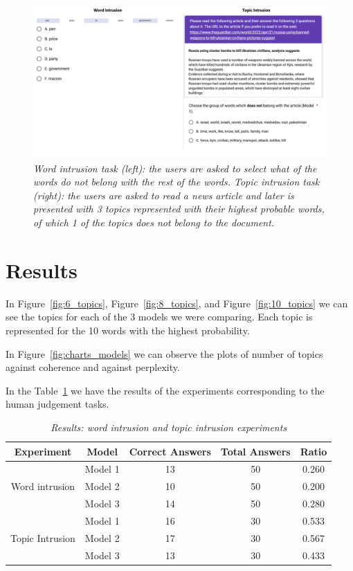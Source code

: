 \documentclass[twoside,12pt,a4paper]{article}
\begin{document}
\begin{figure}[h]
\centering
\includegraphics[scale=0.35]{forms_results.png}
\caption{\textit{Word intrusion task (left): the users are asked to select what of the words do not belong with the rest of the words. Topic intrusion task (right): the users are asked to read a news article and later is presented with 3 topics represented with their highest probable words, of which 1 of the topics does not belong to the document.}}
\label{fig:forms_results}
\end{figure}

\clearpage
\section{Results}
In Figure~\ref{fig:6_topics}, Figure~\ref{fig:8_topics}, and Figure~\ref{fig:10_topics} we can see the topics for each of the 3 models we were comparing. Each topic is represented for the 10 words with the highest probability.

In Figure~\ref{fig:charts_models} we can observe the plots of number of topics against coherence and against perplexity.

In the Table~\ref{table:forms_results} we have the results of the experiments corresponding to the human judgement tasks.\\

\begin{table}[h!]
\centering
\begin{tabular}{c c c c c} 
\hline
Experiment & Model & Correct Answers & Total Answers & Ratio \\ [0.5ex] 
\hline
& Model 1 & 13 & 50 & 0.260\\ 
Word intrusion & Model 2 & 10 & 50 & 0.200 \\
& Model 3 & 14 & 50 & 0.280 \\ [1ex] 
\hline
& Model 1 & 16 & 30 & 0.533 \\
Topic Intrusion & Model 2 & 17 & 30 & 0.567 \\
& Model 3 & 13 & 30 & 0.433 \\ [1ex] 
\hline
\end{tabular}
\caption{\textit{Results: word intrusion and topic intrusion experiments}}
\label{table:forms_results}
\end{table}
\end{document}
